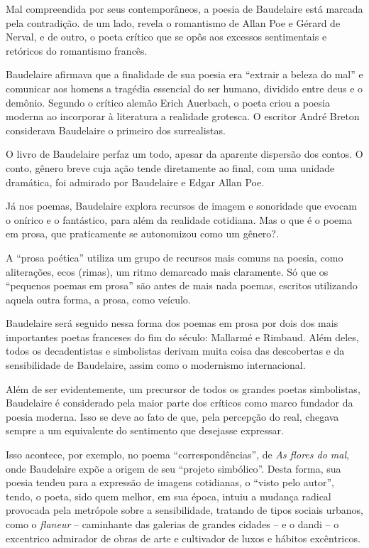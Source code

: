 \documentclass[12pt]{extarticle}
\begin{document}
Mal compreendida por seus contemporâneos, a poesia de Baudelaire está
marcada pela contradição. de um lado, revela o romantismo de Allan Poe e
Gérard de Nerval, e de outro, o poeta crítico que se opôs aos excessos
sentimentais e retóricos do romantismo francês.

Baudelaire afirmava que a finalidade de sua poesia era ``extrair a
beleza do mal'' e comunicar aos homens a tragédia essencial do ser
humano, dividido entre deus e o demônio.
Segundo o crítico alemão Erich Auerbach, o poeta criou a poesia moderna
ao incorporar à literatura a realidade grotesca. O escritor André Breton
considerava Baudelaire o primeiro dos surrealistas.




O livro de Baudelaire perfaz um todo, apesar da aparente dispersão dos
contos.
O conto, gênero breve cuja ação tende diretamente ao final, com uma
unidade dramática, foi admirado por Baudelaire e Edgar Allan Poe.




Já nos poemas, Baudelaire explora recursos de imagem e sonoridade que
evocam o onírico e o fantástico, para além da realidade cotidiana.
Mas o que é o poema em prosa, que praticamente se autonomizou como um
gênero?.

A ``prosa poética'' utiliza um grupo de recursos mais comuns na poesia,
como aliterações, ecos (rimas), um ritmo demarcado mais claramente.
Só que os ``pequenos poemas em prosa'' são antes de mais nada poemas,
escritos utilizando aquela outra forma, a prosa, como veículo.

Baudelaire será seguido nessa forma dos poemas em prosa por dois dos
mais importantes poetas franceses do fim do século: Mallarmé e
Rimbaud.
Além deles, todos os decadentistas e simbolistas derivam muita coisa
das descobertas e da sensibilidade de Baudelaire, assim como o
modernismo internacional.

Além de ser evidentemente, um precursor de todos os grandes poetas
simbolistas, Baudelaire é considerado pela maior parte dos críticos como
marco fundador da poesia moderna. Isso se deve ao fato de que, pela
percepção do real, chegava sempre a um equivalente do
sentimento que desejasse expressar.

Isso acontece, por exemplo, no poema ``correspondências'', de
\emph{As flores do mal}, onde Baudelaire expõe a origem de seu ``projeto simbólico''.
Desta forma, sua poesia tendeu para a expressão de imagens cotidianas, o
``visto pelo autor'', tendo, o poeta, sido quem melhor, em sua época,
intuiu a mudança radical provocada pela
metrópole sobre a
sensibilidade, tratando de tipos sociais urbanos, como o \textit{flaneur} --
caminhante das galerias de grandes cidades -- e o dandi -- o excentrico
admirador de obras de arte e cultivador de luxos e hábitos excêntricos.
\end{document}
